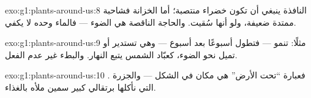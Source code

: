 \begin{solution}{exo:g1:plants-around-us:8}
 النافذة ينبغي أن تكون خضراء منتصبة؛ أما  الخزانة فشاحبة
ممتدة ضعيفة، ولو أنها سُقيت. والحاجة الناقصة هي الضوء --- فالماء
وحده لا يكفي.
\end{solution}

\begin{solution}{exo:g1:plants-around-us:9}
مثلًا:  تنمو --- فتطول أسبوعًا بعد أسبوع --- وهي تستدير أو
تميل نحو الضوء، كعبّاد الشمس يتبع النهار. والبطء غير عدم الفعل.
\end{solution}

\begin{solution}{exo:g1:plants-around-us:10}
. فعبارة ``تحت الأرض'' هي مكان  في الشكل --- والجزرة
التي نأكلها  برتقالي كبير سمين ملأه  بالغذاء.
\end{solution}
